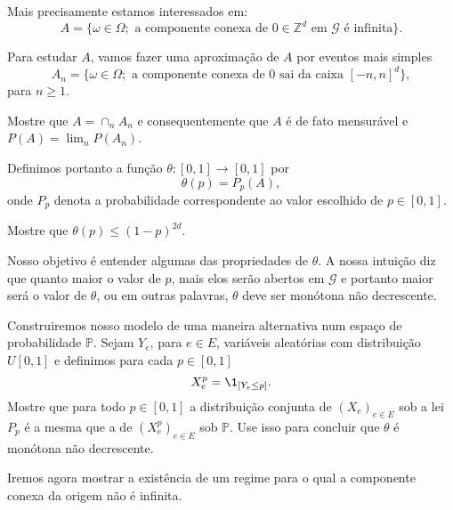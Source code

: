 \begin{topics}
Mais precisamente estamos interessados em:
\begin{equation}
  A = \big\{\omega \in \Omega; \text{ a componente conexa de $0 \in \mathbb{Z}^d$ em $\mathcal{G}$ é infinita} \big\}.
\end{equation}

Para estudar $A$, vamos fazer uma aproximação de $A$ por eventos mais simples
\begin{equation}
  A_n = \big\{ \omega \in \Omega; \text{ a componente conexa de $0$ sai da caixa $[-n, n]^d$}\},
\end{equation}
para $n \geq 1$.

\begin{exercise}
  Mostre que $A = \cap_n A_n$ e consequentemente que $A$ é de fato mensurável e $P(A) = \lim_n P(A_n)$.
\end{exercise}

Definimos portanto a função $\theta:[0,1] \to [0,1]$ por
\begin{equation}
  \theta(p) = P_p(A),
\end{equation}
onde $P_p$ denota a probabilidade correspondente ao valor escolhido de $p \in [0,1]$.

\begin{exercise}
  Mostre que $\theta(p) \leq (1-p)^{2d}$.
\end{exercise}

Nosso objetivo é entender algumas das propriedades de $\theta$.
A nossa intuição diz que quanto maior o valor de $p$, mais elos serão abertos em $\mathcal{G}$ e portanto maior será o valor de $\theta$, ou em outras palavras, $\theta$ deve ser monótona não decrescente.

\begin{exercise}
  Construiremos nosso modelo de uma maneira alternativa num espaço de probabilidade $\mathbb{P}$.
  Sejam $Y_e$, para $e \in E$, variáveis aleatórias \iid com distribuição $U[0,1]$ e definimos para cada $p \in [0,1]$
  \begin{equation}
    X^p_e = \1_{[Y_e \leq p]}.
  \end{equation}
  Mostre que para todo $p \in [0,1]$ a distribuição conjunta de $(X_e)_{e \in E}$ sob a lei $P_p$ é a mesma que a de $(X^p_e)_{e \in E}$ sob $\mathbb{P}$.
  Use isso para concluir que $\theta$ é monótona não decrescente.
\end{exercise}

Iremos agora mostrar a existência de um regime para o qual a componente conexa da origem não é infinita.


\end{topics}
